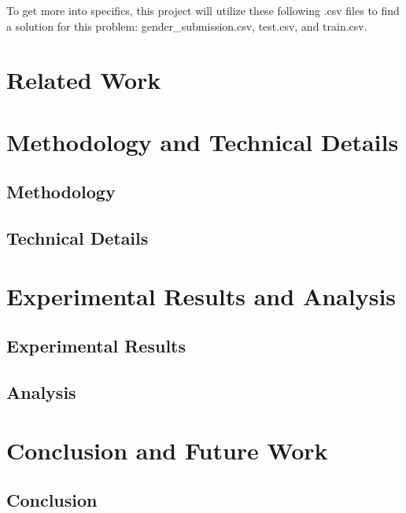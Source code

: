 \documentclass{APA}[12pt]
\begin{document}
To get more into specifics, this project will utilize these following .csv files to find a solution for this problem: gender\_submission.csv, test.csv, and train.csv.

\newpage



\section{Related Work}


\newpage



\section{Methodology and Technical Details}

\subsection{Methodology}

\subsection{Technical Details}

\newpage



\section{Experimental Results and Analysis}

\subsection{Experimental Results}

\subsection{Analysis}


\newpage

\section{Conclusion and Future Work}

\subsection{Conclusion}
\end{document}
